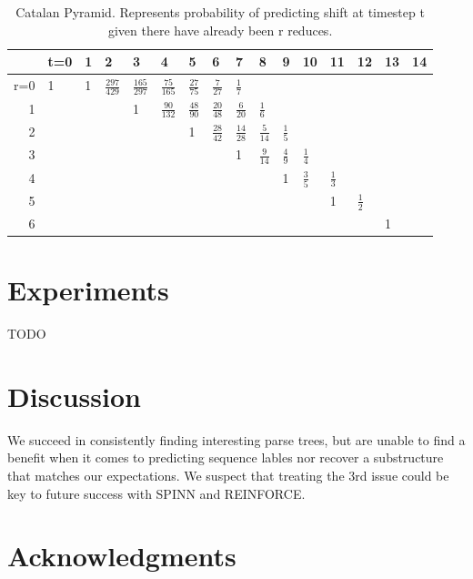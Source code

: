 \documentclass[11pt,a4paper]{article}
\begin{document}
\begin{table}
\small
\centering
\begin{tabular}{|r|l|l|l|l|l|l|l|l|l|l|l|l|l|l|l|}
\hline & t=0 & 1 & 2 & 3 & 4 & 5 & 6 & 7 & 8 & 9 & 10 & 11 & 12 & 13 & 14 \\ \hline
r=0 & 1 & 1 & $\frac{297}{429}$ & $\frac{165}{297}$ & $\frac{75}{165}$ & $\frac{27}{75}$ & $\frac{7}{27}$ & $\frac{1}{7}$ &   &   &   &   &   &   &   \\
1 &   &   &   & 1 & $\frac{90}{132}$ & $\frac{48}{90}$ & $\frac{20}{48}$ & $\frac{6}{20}$ & $\frac{1}{6}$ &   &   &   &   &   &   \\
2 &   &   &   &   &   & 1 & $\frac{28}{42}$ & $\frac{14}{28}$ & $\frac{5}{14}$ & $\frac{1}{5}$ &   &   &   &   &   \\
3 &   &   &   &   &   &   &   & 1 & $\frac{9}{14}$ & $\frac{4}{9}$ & $\frac{1}{4}$ &   &   &   &   \\
4 &   &   &   &   &   &   &   &   &   & 1 & $\frac{3}{5}$ & $\frac{1}{3}$ &   &   &   \\
5 &   &   &   &   &   &   &   &   &   &   &   & 1 & $\frac{1}{2}$ &   &   \\
6 &   &   &   &   &   &   &   &   &   &   &   &   &   & 1 &   \\
\hline
\end{tabular}
\caption{Catalan Pyramid. Represents probability of predicting shift at timestep t given there have already been r reduces.}
\label{tab:catalan-pyramid}
\end{table}

\section{Experiments}

TODO

\section{Discussion}

We succeed in consistently finding interesting parse trees, but are unable to find a benefit when it comes to predicting sequence lables nor recover a substructure that matches our expectations. We suspect that treating the 3rd issue could be key to future success with SPINN and REINFORCE.


\section*{Acknowledgments}
\end{document}
